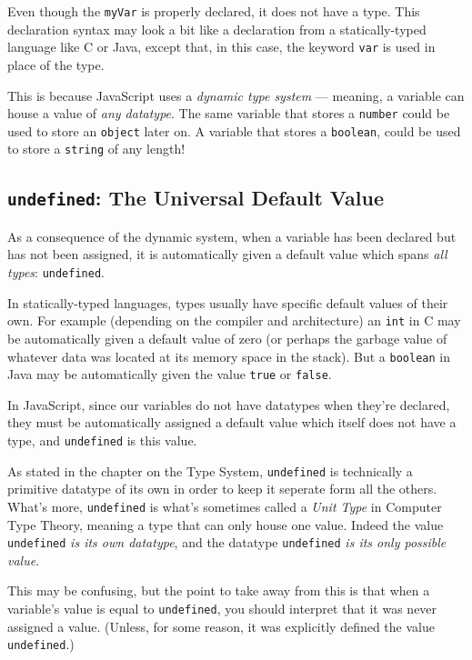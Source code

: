 \documentclass[11pt,letter]{book}
\begin{document}
    Even though the \texttt{myVar} is properly declared, it does not have a type. This declaration 
    syntax may look a bit like a declaration from a statically-typed language like C or Java, except
    that, in this case, the keyword \texttt{var} is used in place of the type.
    
    This is because JavaScript uses a \emph{dynamic type system} --- meaning, a variable can house a 
    value of \emph{any datatype}. The same variable that stores a \texttt{number} could be used to 
    store an \texttt{object} later on. A variable that stores a \texttt{boolean}, could be used to 
    store a \texttt{string} of any length!
    
    \subsection{\texttt{undefined}: The Universal Default Value}
    
    As a consequence of the dynamic system, when a variable has been declared but has not been 
    assigned, it is automatically given a default value which spans \emph{all types}: 
    \texttt{undefined}.
    
    In statically-typed languages, types usually have specific default values of their own. For 
    example (depending on the compiler and architecture) an \texttt{int} in C may be automatically
    given a default value of zero (or perhaps the garbage value of whatever data was located at its 
    memory space in the stack). But a \texttt{boolean} in Java may be automatically given the value 
    \texttt{true} or \texttt{false}.
    
    In JavaScript, since our variables do not have datatypes when they're declared, they must be 
    automatically assigned a default value which itself does not have a type, and \texttt{undefined}
    is this value.
    
    As stated in the chapter on the Type System, \texttt{undefined} is technically a primitive 
    datatype of its own in order to keep it seperate form all the others. What's more, 
    \texttt{undefined} is what's sometimes called a \emph{Unit Type} in Computer Type Theory, 
    meaning a type that can only house one value. Indeed the value \texttt{undefined} \emph{is its 
    own datatype}, and the datatype \texttt{undefined} \emph{is its only possible value}.
    
    This may be confusing, but the point to take away from this is that when a variable's value is
    equal to \texttt{undefined}, you should interpret that it was never assigned a value. (Unless, 
    for some reason, it was explicitly defined the value \texttt{undefined}.)
    
\end{document}
